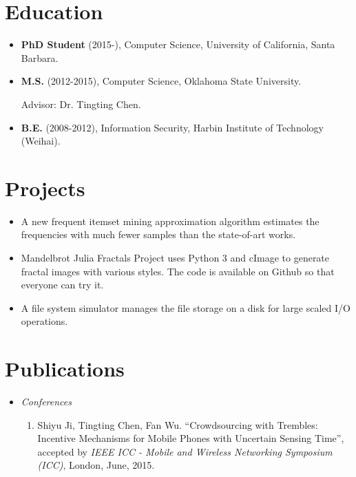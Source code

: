 \documentclass{res}
\begin{document}
\begin{resume}

\section{\sc Education}
\begin{itemize}
\item {\bf PhD Student} (2015-), Computer Science, University of California, Santa Barbara.

\item {\bf M.S.} (2012-2015), Computer Science, Oklahoma State University. %

Advisor: Dr. Tingting Chen.

\item {\bf B.E.} (2008-2012), Information Security, Harbin Institute of Technology (Weihai). %
\end{itemize}

\section{\sc Projects}
\begin{itemize}
\item A new frequent itemset mining approximation algorithm estimates the frequencies with much fewer samples than the state-of-art works.

\item Mandelbrot Julia Fractals Project uses Python 3 and cImage to generate fractal images with various styles. The code is available on Github so that everyone can try it.

\item A file system simulator manages the file storage on a disk for large scaled I/O operations. \end{itemize}

\section{\sc Publications}
\begin{itemize}
\item {\it Conferences}
\begin{enumerate}
\item Shiyu Ji, Tingting Chen, Fan Wu. ``Crowdsourcing with Trembles: Incentive Mechanisms for Mobile Phones with Uncertain Sensing Time'', accepted by {\it IEEE ICC - Mobile and Wireless Networking Symposium (ICC)}, London, June, 2015.


\end{enumerate}
\end{itemize}
\end{resume}
\end{document}
